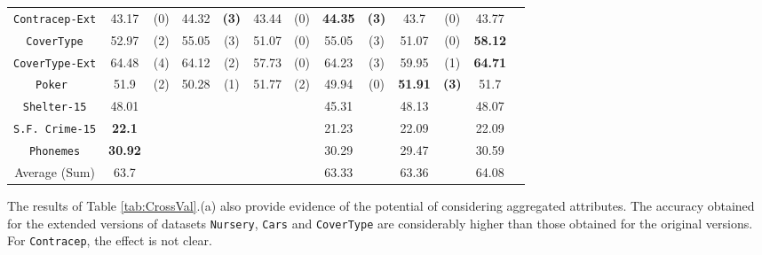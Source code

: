 \begin{table*}[t]
\begin{tabular}{c|cc|cc|cc|cc|cc|cc}
{\tt Contracep-Ext} & 43.17    & (0)    & 44.32    &{\bf(3)}& 43.44    & (0)    &{\bf44.35}&{\bf(3)}& 43.7     & (0)    & 43.77    &        \\
{\tt CoverType}     & 52.97    & (2)    & 55.05    & (3)    & 51.07    & (0)    & 55.05    & (3)    & 51.07    & (0)    &{\bf58.12}&        \\
{\tt CoverType-Ext} & 64.48    & (4)    & 64.12    & (2)    & 57.73    & (0)    & 64.23    & (3)    & 59.95    & (1)    &{\bf64.71}&        \\ 
{\tt Poker }        & 51.9     & (2)    & 50.28    & (1)    & 51.77    & (2)    & 49.94    & (0)    &{\bf51.91}&{\bf(3)}& 51.7     &        \\ 
{\tt Shelter-15}    & 48.01    &        &          &        &          &        & 45.31    &        & 48.13    &        & 48.07    &        \\   
{\tt S.F. Crime-15} &{\bf22.1} &        &          &        &          &        & 21.23    &        & 22.09    &        & 22.09    &        \\ 
{\tt Phonemes}      &{\bf30.92}&        &          &        &          &        & 30.29    &        & 29.47    &        & 30.59    &        \\
\hline
Average (Sum)       &     63.7 &        &          &        &          &        & 63.33    &        & 63.36    &        & 64.08    & 

\end{tabular}
\label{exp:thirdset}
\normalsize
\end{table*}


The results of  Table \ref{tab:CrossVal}.(a) also
provide evidence of  the potential
of considering aggregated attributes. 
The accuracy obtained for the extended versions of datasets
{\tt Nursery}, {\tt Cars} and {\tt CoverType} are considerably higher than those obtained for 
the original versions. For {\tt Contracep}, the effect is not clear.

